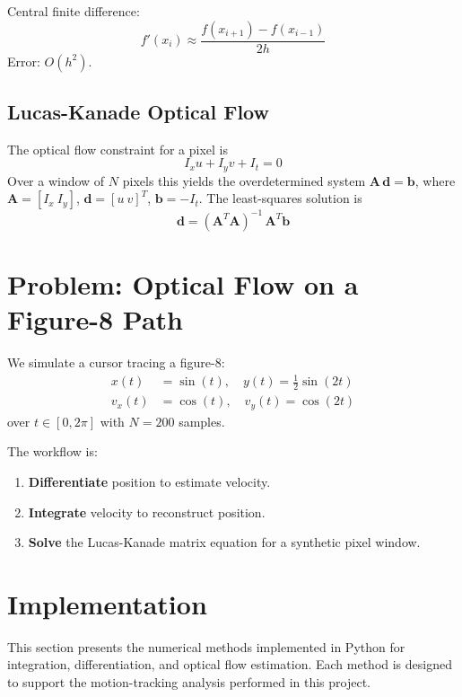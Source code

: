 \documentclass[letterpaper,twocolumn,fleqn]{article}
\begin{document}
Central finite difference:
\begin{equation}
  f'(x_i) \approx \frac{f(x_{i+1}) - f(x_{i-1})}{2h}
  \label{eq:central}
\end{equation}
Error: $O(h^2)$.

\subsection{Lucas-Kanade Optical Flow}
The optical flow constraint for a pixel is
\begin{equation}
  I_x u + I_y v + I_t = 0
  \label{eq:ofc}
\end{equation}
Over a window of $N$ pixels this yields the overdetermined system
$\mathbf{A}\,\mathbf{d} = \mathbf{b}$, where
$\mathbf{A} = [I_x\ I_y]$, $\mathbf{d} = [u\ v]^T$, $\mathbf{b} = -I_t$.
The least-squares solution is
\begin{equation}
  \mathbf{d} = (\mathbf{A}^T \mathbf{A})^{-1}\, \mathbf{A}^T \mathbf{b}
  \label{eq:lk}
\end{equation}


\section{Problem: Optical Flow on a Figure-8 Path}

We simulate a cursor tracing a figure-8:
\begin{align}
  x(t) &= \sin(t), \quad y(t) = \tfrac{1}{2}\sin(2t) \\
  v_x(t) &= \cos(t), \quad v_y(t) = \cos(2t)
\end{align}
over $t \in [0, 2\pi]$ with $N = 200$ samples.

The workflow is:
\begin{enumerate}
  \item \textbf{Differentiate} position to estimate velocity.
  \item \textbf{Integrate} velocity to reconstruct position.
  \item \textbf{Solve} the Lucas-Kanade matrix equation for a
        synthetic pixel window.
\end{enumerate}


\section{Implementation}

This section presents the numerical methods implemented in Python for integration, differentiation, and optical flow estimation. Each method is designed to support the motion-tracking analysis performed in this project.
\end{document}
